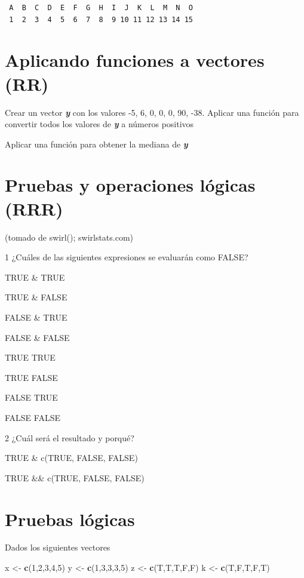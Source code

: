 \documentclass[]{book}
\newenvironment{Shaded}{\begin{snugshade}}{\end{snugshade}}
\newcommand{\DecValTok}[1]{\textcolor[rgb]{0.00,0.00,0.81}{#1}}
\newcommand{\KeywordTok}[1]{\textcolor[rgb]{0.13,0.29,0.53}{\textbf{#1}}}
\newcommand{\NormalTok}[1]{#1}
\newcommand{\StringTok}[1]{\textcolor[rgb]{0.31,0.60,0.02}{#1}}
\begin{document}
\begin{verbatim}
 A  B  C  D  E  F  G  H  I  J  K  L  M  N  O 
 1  2  3  4  5  6  7  8  9 10 11 12 13 14 15 
\end{verbatim}

\hypertarget{aplicando-funciones-a-vectores-rr}{%
\section{Aplicando funciones a vectores (RR)}\label{aplicando-funciones-a-vectores-rr}}

Crear un vector \textbf{\emph{y}} con los valores -5, 6, 0, 0, 0, 90, -38. Aplicar una función para convertir todos los valores de \textbf{\emph{y}} a números positivos

Aplicar una función para obtener la mediana de \textbf{\emph{y}}

\hypertarget{pruebas-y-operaciones-luxf3gicas-rrr}{%
\section{Pruebas y operaciones lógicas (RRR)}\label{pruebas-y-operaciones-luxf3gicas-rrr}}

(tomado de swirl(); swirlstats.com)

1 ¿Cuáles de las siguientes expresiones se evaluarán como FALSE?

TRUE \& TRUE

TRUE \& FALSE

FALSE \& TRUE

FALSE \& FALSE

TRUE \textbar{} TRUE

TRUE \textbar{} FALSE

FALSE \textbar{} TRUE

FALSE \textbar{} FALSE

2 ¿Cuál será el resultado y porqué?

TRUE \& c(TRUE, FALSE, FALSE)

TRUE \&\& c(TRUE, FALSE, FALSE)

\hypertarget{pruebas-luxf3gicas}{%
\section{Pruebas lógicas}\label{pruebas-luxf3gicas}}

Dados los siguientes vectores

\begin{Shaded}
\begin{Highlighting}[]
\NormalTok{x <-}\StringTok{ }\KeywordTok{c}\NormalTok{(}\DecValTok{1}\NormalTok{,}\DecValTok{2}\NormalTok{,}\DecValTok{3}\NormalTok{,}\DecValTok{4}\NormalTok{,}\DecValTok{5}\NormalTok{)}
\NormalTok{y <-}\StringTok{ }\KeywordTok{c}\NormalTok{(}\DecValTok{1}\NormalTok{,}\DecValTok{3}\NormalTok{,}\DecValTok{3}\NormalTok{,}\DecValTok{3}\NormalTok{,}\DecValTok{5}\NormalTok{)}
\NormalTok{z <-}\StringTok{ }\KeywordTok{c}\NormalTok{(T,T,T,F,F)}
\NormalTok{k <-}\StringTok{ }\KeywordTok{c}\NormalTok{(T,F,T,F,T)}
\end{Highlighting}
\end{Shaded}
\end{document}
